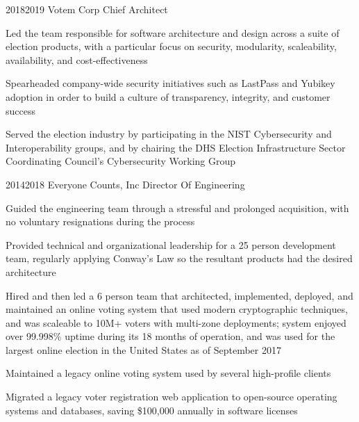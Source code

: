 \documentclass{article}
\begin{document}
\job
  {2018}{2019}
  {Votem Corp}
  {Chief Architect}
  {\begin{achievements}
    \item Led the team responsible for software architecture and design across a suite of election products, with a particular focus on security, modularity, scaleability, availability, and cost-effectiveness
    \item Spearheaded company-wide security initiatives such as LastPass and Yubikey adoption in order to build a culture of transparency, integrity, and customer success
    \item Served the election industry by participating in the NIST Cybersecurity and Interoperability groups, and by chairing the DHS Election Infrastructure Sector Coordinating Council's Cybersecurity Working Group
  \end{achievements}}

\pagebreak

\job
  {2014}{2018}
  {Everyone Counts, Inc}
  {Director Of Engineering}
  {\begin{achievements}
    \item Guided the engineering team through a stressful and prolonged acquisition, with no voluntary resignations during the process
    \item Provided technical and organizational leadership for a 25 person development team, regularly applying Conway's Law so the resultant products had the desired architecture
    \item Hired and then led a 6 person team that architected, implemented, deployed, and maintained an online voting system that used modern cryptographic techniques, and was scaleable to 10M+ voters with multi-zone deployments; system enjoyed over 99.998\% uptime during its 18 months of operation, and was used for the largest online election in the United States as of September 2017
    \item Maintained a legacy online voting system used by several high-profile clients
    \item Migrated a legacy voter registration web application to open-source operating systems and databases, saving \$100,000 annually in software licenses
  \end{achievements}}
\end{document}
